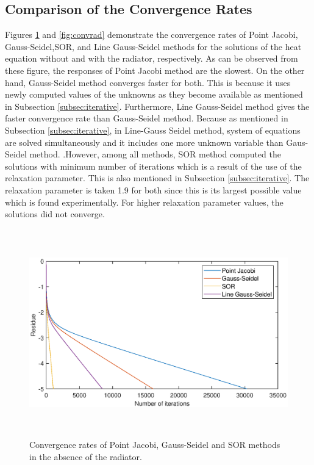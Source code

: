 \documentclass[letterpaper,12pt]{article}
\begin{document}
\subsection{Comparison of the Convergence Rates}
Figures \ref{fig:convnorad} and \ref{fig:convrad} demonstrate the convergence rates of Point
Jacobi, Gauss-Seidel,SOR, and Line Gauss-Seidel methods for the solutions of the heat equation without and with
the radiator, respectively. As can be observed from these figure, the responses of Point Jacobi
method are the slowest. On the other hand, Gauss-Seidel method converges faster for both.
This is because it uses newly computed values of the unknowns as they become available as 
mentioned in Subsection \ref{subsec:iterative}. Furthermore, Line Gauss-Seidel method gives the faster convergence
rate than Gauss-Seidel method. Because as mentioned in Subsection \ref{subsec:iterative}, in Line-Gauss Seidel method,
system of equations are solved simultaneously and it includes one more unknown variable than Gaus-Seidel method.
.However, among all methods, SOR method computed the solutions with minimum number
of iterations which is a result of the use of the relaxation parameter. This is also mentioned
in Subsection \ref{subsec:iterative}. The relaxation parameter is taken 1.9 for both since this is its largest
possible value which is found experimentally. For higher relaxation parameter values, the
solutions did not converge.

\begin{figure}[H] 
	\centering 
	\includegraphics[max height=9cm]{graphs/residual_SOR19_norad.eps}
	\caption{Convergence rates of Point Jacobi, Gauss-Seidel and SOR methods in the absence of the radiator.}
 	\label{fig:convnorad}
\end{figure}
\end{document}
